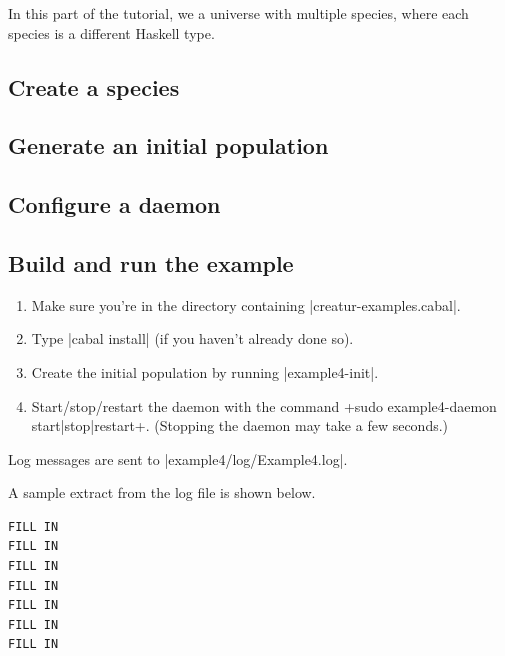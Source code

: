 \documentclass[a4paper,10pt]{article}
\begin{document}
In this part of the tutorial, we a universe with multiple species,
where each species is a different Haskell type.

\subsection{Create a species}
\label{sec:species4}





\subsection{Generate an initial population}
\label{sec:pop4}



\subsection{Configure a daemon}
\label{sec:daemon4}



\subsection{Build and run the example}
\label{sec:run4}

\begin{enumerate}
\item Make sure you're in the directory containing |creatur-examples.cabal|.
\item Type |cabal install| (if you haven't already done so).
\item Create the initial population by running |example4-init|.
\item Start/stop/restart the daemon with the command
\UndefineShortVerb{\|}
\DefineShortVerb{\+}
+sudo example4-daemon start|stop|restart+.
\UndefineShortVerb{\+}
\DefineShortVerb{\|}
(Stopping the daemon may take a few seconds.)
\end{enumerate}

Log messages are sent to |example4/log/Example4.log|.

A sample extract from the log file is shown below.

\begin{verbatim}
FILL IN
FILL IN
FILL IN
FILL IN
FILL IN
FILL IN
FILL IN
\end{verbatim}
\end{document}
